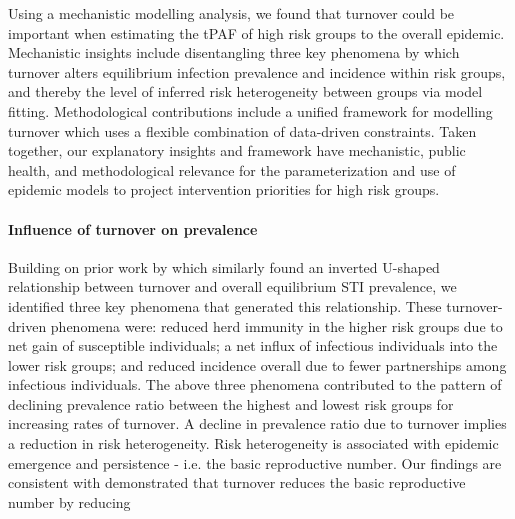 Using a mechanistic modelling analysis,
we found that turnover could be important when
estimating the tPAF of high risk groups to the overall epidemic.
Mechanistic insights include disentangling
three key phenomena by which turnover
alters equilibrium infection prevalence and incidence within risk groups,
and thereby the level of inferred risk heterogeneity between groups via model fitting.
Methodological contributions include a unified framework for modelling turnover
which uses a flexible combination of data-driven constraints.
Taken together, our explanatory insights and framework
have mechanistic, public health, and methodological relevance for
the parameterization and use of epidemic models
to project intervention priorities for high risk groups.
\paragraph{Influence of turnover on prevalence}
Building on prior work by \citet{Stigum1994,Zhang2012,Henry2015}
which similarly found an inverted U-shaped relationship between
turnover and overall equilibrium STI prevalence,
we identified three key phenomena that generated this relationship.
These turnover-driven phenomena were:
reduced herd immunity in the higher risk groups due to net gain of susceptible individuals;
a net influx of infectious individuals into the lower risk groups; and
reduced incidence overall due to fewer partnerships among infectious individuals.
The above three phenomena contributed to the pattern			%
of declining prevalence ratio between the highest and lowest risk groups
for increasing rates of turnover.
A decline in prevalence ratio due to turnover implies a reduction in risk heterogeneity.
Risk heterogeneity is associated with epidemic emergence and persistence \citep{May1988} - i.e. the basic reproductive number.
Our findings are consistent with  \citet{Henry2015} demonstrated that turnover reduces the basic reproductive number by reducing 

